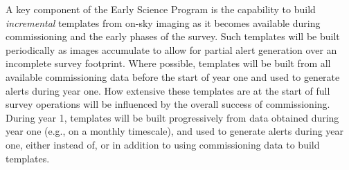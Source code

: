 A key component of the Early Science Program is the capability to build {\it incremental} templates from on-sky imaging as it becomes available during commissioning and the early phases of the survey.
Such templates will be built periodically as images accumulate to allow for partial alert generation over an incomplete survey footprint.
Where possible, templates will be built from all available commissioning data before the start of year one and used to generate alerts during year one.
How extensive these templates are at the start of full survey operations will be influenced by the overall success of commissioning.
During year 1, templates will be built progressively from data obtained during year one (e.g., on a monthly timescale), and used to generate alerts during year one, either instead of, or in addition to using commissioning data to build templates.
